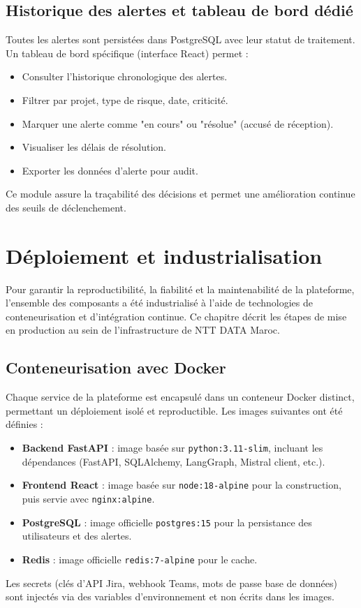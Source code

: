 \subsection{Historique des alertes et tableau de bord dédié}
Toutes les alertes sont persistées dans PostgreSQL avec leur statut de traitement. Un tableau de bord spécifique (interface React) permet :
\begin{itemize}
    \renewcommand{\labelitemi}{—}
    \item Consulter l’historique chronologique des alertes.
    \item Filtrer par projet, type de risque, date, criticité.
    \item Marquer une alerte comme "en cours" ou "résolue" (accusé de réception).
    \item Visualiser les délais de résolution.
    \item Exporter les données d’alerte pour audit.
\end{itemize}
Ce module assure la traçabilité des décisions et permet une amélioration continue des seuils de déclenchement.

\section{Déploiement et industrialisation}
Pour garantir la reproductibilité, la fiabilité et la maintenabilité de la plateforme, l’ensemble des composants a été industrialisé à l’aide de technologies de conteneurisation et d’intégration continue. Ce chapitre décrit les étapes de mise en production au sein de l’infrastructure de NTT DATA Maroc.

\subsection{Conteneurisation avec Docker}
Chaque service de la plateforme est encapsulé dans un conteneur Docker distinct, permettant un déploiement isolé et reproductible. Les images suivantes ont été définies :
\begin{itemize}
    \renewcommand{\labelitemi}{—}
    \item \textbf{Backend FastAPI} : image basée sur \texttt{python:3.11-slim}, incluant les dépendances (FastAPI, SQLAlchemy, LangGraph, Mistral client, etc.).
    \item \textbf{Frontend React} : image basée sur \texttt{node:18-alpine} pour la construction, puis servie avec \texttt{nginx:alpine}.
    \item \textbf{PostgreSQL} : image officielle \texttt{postgres:15} pour la persistance des utilisateurs et des alertes.
    \item \textbf{Redis} : image officielle \texttt{redis:7-alpine} pour le cache.
\end{itemize}
Les secrets (clés d’API Jira, webhook Teams, mots de passe base de données) sont injectés via des variables d’environnement et non écrits dans les images.

